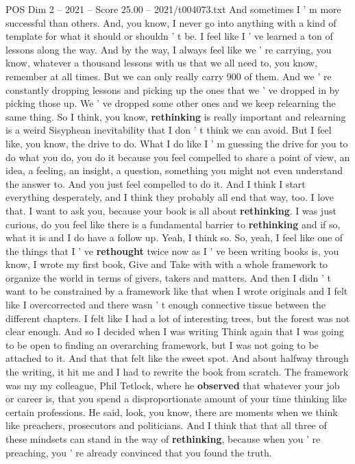 \begin{textsample}{POS Dim 2 – 2021 – Score 25.00 – 2021/t004073.txt}
And sometimes I ' m more successful than others.
And, you know, I never go into anything with a kind of template for what it should or shouldn ' t be.
I feel like I ' ve learned a ton of lessons along the way.
And by the way, I always feel like we ' re carrying, you know, whatever a thousand lessons with us that we all need to, you know, remember at all times.
But we can only really carry 900 of them.
And we ' re constantly dropping lessons and picking up the ones that we ' ve dropped in by picking those up.
We ' ve dropped some other ones and we keep relearning the same thing.
So I think, you know, \textbf{rethinking} is really important and relearning is a weird Sisyphean inevitability that I don ' t think we can avoid.
But I feel like, you know, the drive to do.
What I do like I ' m guessing the drive for you to do what you do, you do it because you feel compelled to share a point of view, an idea, a feeling, an insight, a question, something you might not even understand the answer to.
And you just feel compelled to do it.
And I think I start everything desperately, and I think they probably all end that way, too.
I love that.
I want to ask you, because your book is all about \textbf{rethinking}.
I was just curious, do you feel like there is a fundamental barrier to \textbf{rethinking} and if so, what it is and I do have a follow up.
Yeah, I think so.
So, yeah, I feel like one of the things that I ' ve \textbf{rethought} twice now as I ' ve been writing books is, you know, I wrote my first book, Give and Take with with a whole framework to organize the world in terms of givers, takers and matters.
And then I didn ' t want to be constrained by a framework like that when I wrote originals and I felt like I overcorrected and there wasn ' t enough connective tissue between the different chapters.
I felt like I had a lot of interesting trees, but the forest was not clear enough.
And so I decided when I was writing Think again that I was going to be open to finding an overarching framework, but I was not going to be attached to it.
And that that felt like the sweet spot.
And about halfway through the writing, it hit me and I had to rewrite the book from scratch.
The framework was my my colleague, Phil Tetlock, where he \textbf{observed} that whatever your job or career is, that you spend a disproportionate amount of your time thinking like certain professions.
He said, look, you know, there are moments when we think like preachers, prosecutors and politicians.
And I think that that all three of these mindsets can stand in the way of \textbf{rethinking}, because when you ' re preaching, you ' re already convinced that you found the truth.

\end{textsample}
